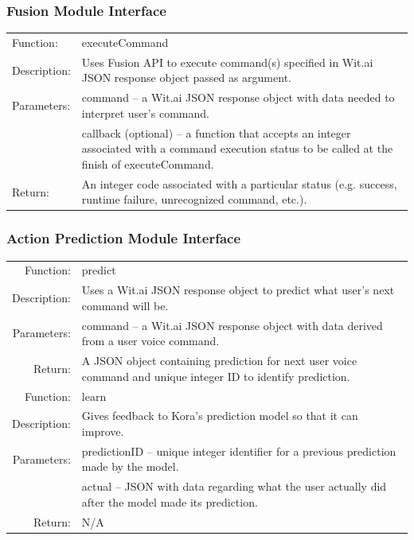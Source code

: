 \documentclass[onecolumn, draftclsnofoot,10pt, compsoc]{IEEEtran}
\def \botname{Kora\xspace}
\begin{document}
        \subsubsection{Fusion Module Interface}
            \begin{tabular}[t]{l p{6in}}
                \hline
                Function: & executeCommand \\
                Description: & Uses Fusion API to execute command(s) specified in Wit.ai JSON response object passed as argument. \\
                Parameters: & command -- a Wit.ai JSON response object with data needed to interpret user's command. \\
                            & callback (optional) -- a function that accepts an integer associated with a command execution status to be called at the finish of executeCommand. \\
                Return: & An integer code associated with a particular status (e.g. success, runtime failure, unrecognized command, etc.). \\
                \hline
            \end{tabular}    

        \subsubsection{Action Prediction Module Interface}
            \begin{tabular}[t]{r p{6in}}
                \hline
                Function: & predict \\
                Description: & Uses a Wit.ai JSON response object to predict what user's next command will be. \\
                Parameters: & command -- a Wit.ai JSON response object with data derived from a user voice command. \\
                Return: & A JSON object containing prediction for next user voice command and unique integer ID to identify prediction. \\
                \hline
                Function: & learn \\
                Description: & Gives feedback to \botname's prediction model so that it can improve. \\
                Parameters: & predictionID -- unique integer identifier for a previous prediction made by the model. \\
                            & actual -- JSON with data regarding what the user actually did after the model made its prediction. \\
                Return: & N/A \\
                \hline
            \end{tabular}
\end{document}
